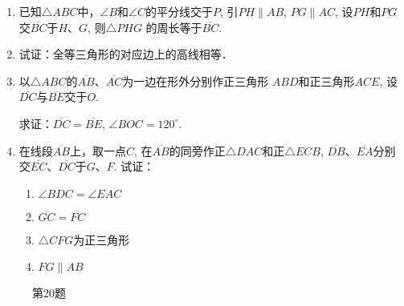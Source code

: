 \begin{enumerate}
\item 已知$\triangle ABC$中，$\angle B$和$\angle C$的平分线交于$P$, 引$PH\parallel
AB$, $PG\parallel AC$, 设$PH$和$PG$交$\overline{BC}$于$H$、$G$, 则$\triangle PHG$
的周长等于$\overline{BC}$.
\item 试证：全等三角形的对应边上的高线相等．
\item 以$\triangle ABC$的$\overline{AB}$、$\overline{AC}$为一边在形外分别作正三角形
$ABD$和正三角形$ACE$, 设$\overline{DC}$与$\overline{BE}$交于$O$.

求证：$\overline{DC}=\overline{BE}$, $\angle BOC=120^{\circ}$.
\item 在线段$\overline{AB}$上，取一点$C$, 在$\overline{AB}$的同旁作正$\triangle DAC$和正$\triangle ECB$, $\overline{DB}$、$\overline{EA}$分别交$\overline{EC}$、$\overline{DC}$于$G$、$F$.
试证：
\begin{enumerate}
    \item $\angle BDC=\angle EAC$
    \item $\overline{GC}=\overline{FC}$
    \item $\triangle CFG$为正三角形
    \item $FG\parallel AB$
\end{enumerate}
\end{enumerate}

\begin{figure}[htp]\centering
    \begin{minipage}[t]{0.48\textwidth}
    \centering
{}
    \caption*{第20题}
    \end{minipage}
    \begin{minipage}[t]{0.48\textwidth}
    \centering
    \caption{}
    \end{minipage}
    \end{figure}


